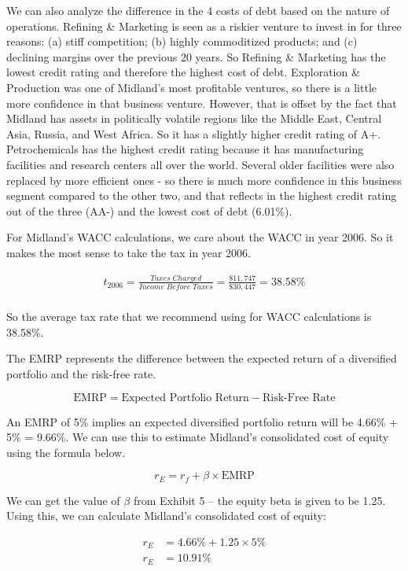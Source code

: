 \documentclass[letterpaper]{article}
\begin{document}
We can also analyze the difference in the 4 costs of debt based on the nature of operations. Refining \& Marketing is seen as a riskier venture to invest in for three reasons: (a) stiff competition; (b) highly commoditized products; and (c) declining margins over the previous 20 years. So Refining \& Marketing has the lowest credit rating and therefore the highest cost of debt. Exploration \& Production was one of Midland's most profitable ventures, so there is a little more confidence in that business venture. However, that is offset by the fact that Midland has assets in politically volatile regions like the Middle East, Central Asia, Russia, and West Africa. So it has a slightly higher credit rating of A+. Petrochemicals has the highest credit rating because it has manufacturing facilities and research centers all over the world. Several older facilities were also replaced by more efficient ones - so there is much more confidence in this business segment compared to the other two, and that reflects in the highest credit rating out of the three (AA-) and the lowest cost of debt (6.01\%).

For Midland's WACC calculations, we care about the WACC in year 2006. So it makes the most sense to take the tax in year 2006.

\begin{align*}
    t_{2006} = \frac{Taxes \;Charged}{Income\; Before\; Taxes} = \frac{\$11,747}{\$30,447} = 38.58\% \\
\end{align*}

So the average tax rate that we recommend using for WACC calculations is 38.58\%.

The EMRP represents the difference between the expected return of a diversified portfolio and the risk-free rate. 

\[
\text{EMRP} = \text{Expected Portfolio Return} - \text{Risk-Free Rate}
\]

An EMRP of 5\% implies an expected diversified portfolio return will be 4.66\% + 5\% = 9.66\%. We can use this to estimate Midland's consolidated cost of equity using the formula below.

\[
r_E = r_f + \beta \times \text{EMRP}
\]

We can get the value of $\beta$ from Exhibit 5 -- the equity beta is given to be 1.25. Using this, we can calculate Midland's consolidated cost of equity:

\begin{align*}
r_E &= 4.66\% + 1.25 \times 5\% \\
r_E &= 10.91\%
\end{align*}
\end{document}
